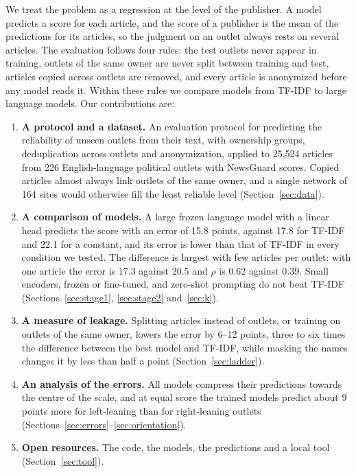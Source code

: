 \documentclass[11pt,a4paper]{article}
\begin{document}
We treat the problem as a regression at the level of the publisher. A model predicts a score for each article, and the
score of a publisher is the mean of the predictions for its articles, so the judgment on an outlet always rests on
several articles. The evaluation follows four rules: the test outlets never appear in training, outlets of the same
owner are never split between training and test, articles copied across outlets are removed, and every article is
anonymized before any model reads it. Within these rules we compare models from TF-IDF to large language models. Our
contributions are:
\begin{enumerate}
  \item \textbf{A protocol and a dataset.} An evaluation protocol for predicting the reliability of unseen outlets from
        their text, with ownership groups, deduplication across outlets and anonymization, applied to 25,524 articles
        from 226 English-language political outlets with NewsGuard scores. Copied articles almost always link outlets of
        the same owner, and a single network of 164 sites would otherwise fill the least reliable level
        (Section~\ref{sec:data}).
  \item \textbf{A comparison of models.} A large frozen language model with a linear head predicts the score with an
        error of 15.8 points, against 17.8 for TF-IDF and 22.1 for a constant, and its error is lower than that of TF-IDF
        in every condition we tested. The difference is largest with few articles per outlet: with one article the error
        is 17.3 against 20.5 and $\rho$ is 0.62 against 0.39. Small encoders, frozen or fine-tuned, and zero-shot
        prompting do not beat TF-IDF (Sections~\ref{sec:stage1}, \ref{sec:stage2} and~\ref{sec:k}).
  \item \textbf{A measure of leakage.} Splitting articles instead of outlets, or training on outlets of the same owner,
        lowers the error by 6--12 points, three to six times the difference between the best model and TF-IDF, while
        masking the names changes it by less than half a point (Section~\ref{sec:ladder}).
  \item \textbf{An analysis of the errors.} All models compress their predictions towards the centre of the scale, and
        at equal score the trained models predict about 9 points more for left-leaning than for right-leaning outlets
        (Sections~\ref{sec:errors}--\ref{sec:orientation}).
  \item \textbf{Open resources.} The code, the models, the predictions and a local tool (Section~\ref{sec:tool}).
\end{enumerate}
\end{document}
